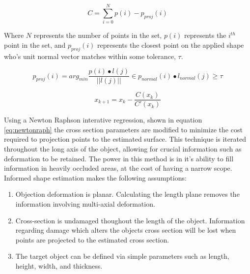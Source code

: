 \documentclass[12pt]{drexelthesis}
\begin{document}
\begin{equation}
	C = \sum_{i=0}^{N}{p(i) - p_{proj}(i)}
\end{equation}

Where $N$ represents the number of points in the set, $p(i)$ represents the $i^{th}$ point in the set, and $p_{proj}(i)$ represents the closest point on the applied shape who's unit normal vector matches within some tolerance, $\tau$.

\begin{equation}
	p_{proj}(i) = arg_{min} \frac{p(i) \bullet l(j)}{||l(j)||} \in p_{normal}(i) \bullet l_{normal}(j) \geq \tau
\end{equation}

\begin{equation}
	\label{eq:newtonraph}
	x_{k+1} = x_{k} - \frac{C(x_{k})}{C'(x_{k})}
\end{equation}

Using a Newton Raphson interative regression, shown in equation \ref{eq:newtonraph} the cross section parameters are modified to minimize the cost required to projection points to the estimated surface. This technique is iterated throughout the long axis of the object, allowing for crucial information such as deformation to be retained. The power in this method is in it's ability to fill information in heavily occluded areas, at the cost of having a narrow scope. Informed shape estimation makes the following assumptions:

\begin{enumerate}
	\item Objection deformation is planar. Calculating the length plane removes the information involving multi-axial deformation.
	\item Cross-section is undamaged thoughout the length of the object. Information regarding damage which alters the objects cross section will be lost when points are projected to the estimated cross section.
	\item The target object can be defined via simple parameters such as length, height, width, and thickness.
\end{enumerate}
\end{document}
